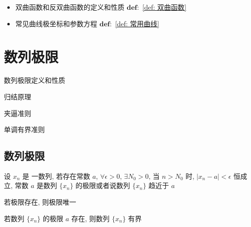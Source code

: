 \begin{anymark}[注]
	\begin{itemize}
		\item 双曲函数和反双曲函数的定义和性质 $\mathbf{def:}$ \ref{def: 双曲函数}
		\item 常见曲线极坐标和参数方程 $\mathbf{def:}$ \ref{def: 常用曲线}
	\end{itemize} 
\end{anymark}





\chapter{数列极限}
\begin{introduction}
	\item 数列极限定义和性质
	\item 归结原理
	\item 夹逼准则
	\item 单调有界准则
\end{introduction}
\section{数列极限}
\begin{definition}[数列极限]
	设 $x_{n}$ 是 一数列, 若存在常数 $a$, $\forall \epsilon>0$, $\exists N_{0}>0$, 当 $n>N_{0}$ 时, $|x_{n}-a|<\epsilon$ 恒成立, 常数 $a$ 是数列 $\{x_{n}\}$ 的极限或者说数列 $\{x_{n}\}$ 趋近于 $a$
\end{definition}


\begin{corollary}[唯一性]
	若极限存在, 则极限唯一
\end{corollary}

\begin{corollary}[有界性]
	若数列 $\{x_{n}\}$ 的极限 $a$ 存在, 则数列 $\{x_{n}\}$ 有界
\end{corollary}

